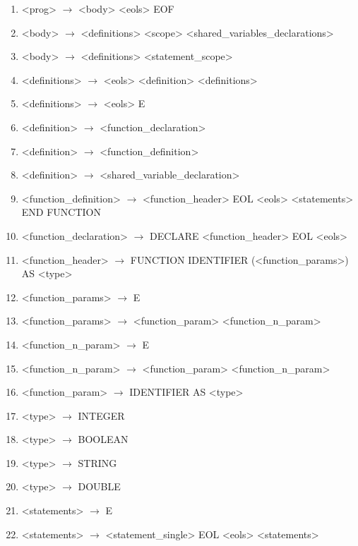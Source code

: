 \begin{enumerate}
\item <prog> $\rightarrow$ <body> <eols> EOF
\item <body> $\rightarrow$ <definitions> <scope> <shared\_variables\_declarations>
\item <body> $\rightarrow$ <definitions> <statement\_scope>

\item <definitions> $\rightarrow$ <eols> <definition> <definitions>
\item <definitions> $\rightarrow$ <eols> E

\item <definition> $\rightarrow$ <function\_declaration>
\item <definition> $\rightarrow$ <function\_definition>
\item <definition> $\rightarrow$ <shared\_variable\_declaration>

\item <function\_definition> $\rightarrow$ <function\_header> EOL <eols> <statements> END FUNCTION
\item <function\_declaration> $\rightarrow$ DECLARE <function\_header> EOL <eols>

\item <function\_header> $\rightarrow$ FUNCTION IDENTIFIER (<function\_params>) AS <type>

\item <function\_params> $\rightarrow$ E
\item <function\_params> $\rightarrow$ <function\_param> <function\_n\_param>

\item <function\_n\_param> $\rightarrow$ E
\item <function\_n\_param> $\rightarrow$ <function\_param> <function\_n\_param>

\item <function\_param> $\rightarrow$ IDENTIFIER AS <type>


\item <type> $\rightarrow$ INTEGER
\item <type> $\rightarrow$ BOOLEAN
\item <type> $\rightarrow$ STRING
\item <type> $\rightarrow$ DOUBLE

\item <statements> $\rightarrow$ E
\item <statements> $\rightarrow$ <statement\_single> EOL <eols> <statements>



\end{enumerate}
